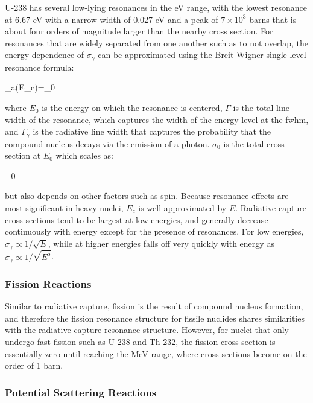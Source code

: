 U-238 has several low-lying resonances in the eV range, with the lowest resonance at 6.67 eV with a narrow width of 0.027 eV and a peak of \(7\times10^3\) barns that is about four orders of magnitude larger than the nearby cross section. For resonances that are widely separated from one another such as to not overlap, the energy dependence of \(\sigma_\gamma\) can be approximated using the Breit-Wigner single-level resonance formula:

\beq
\sigma_a(E_c)=\sigma_0\frac{\Gamma_\gamma}{\Gamma}
\eeq

where \(E_0\) is the energy on which the resonance is centered, \(\Gamma\) is the total line width of the resonance, which captures the width of the energy level at the \gls{fwhm}, and \(\Gamma_\gamma\) is the radiative line width that captures the probability that the compound nucleus decays via the emission of a photon. \(\sigma_0\) is the total cross section at \(E_0\) which scales as:

\beq
\sigma_0\propto{}
\eeq

but also depends on other factors such as spin. Because resonance effects are most significant in heavy nuclei, \(E_c\) is well-approximated by \(E\). Radiative capture cross sections tend to be largest at low energies, and generally decrease continuously with energy except for the presence of resonances. For low energies, \(\sigma_\gamma\propto1/\sqrt{E}\), while at higher energies falls off very quickly with energy as \(\sigma_\gamma\propto1/\sqrt{E^5}\).

\subsubsection{Fission Reactions}

Similar to radiative capture, fission is the result of compound nucleus formation, and therefore the fission resonance structure for fissile nuclides shares similarities with the radiative capture resonance structure. However, for nuclei that only undergo fast fission such as U-238 and Th-232, the fission cross section is essentially zero until reaching the MeV range, where cross sections become on the order of 1 barn.

\subsubsection{Potential Scattering Reactions}
\label{sec:PotentialScattering}

